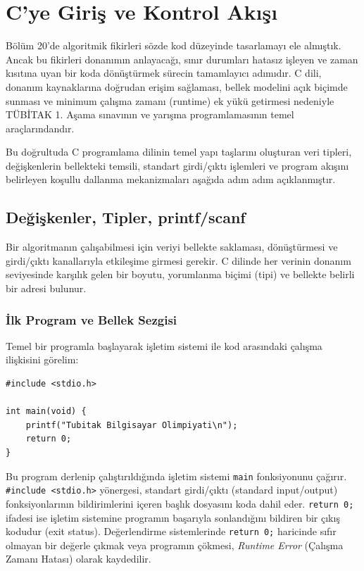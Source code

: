 \chapter[C'ye Giriş ve Kontrol Akışı · \textit{Temel}]{C'ye Giriş ve Kontrol Akışı}

Bölüm 20'de algoritmik fikirleri sözde kod düzeyinde tasarlamayı ele almıştık. Ancak bu fikirleri donanımın anlayacağı, sınır durumları hatasız işleyen ve zaman kısıtına uyan bir koda dönüştürmek sürecin tamamlayıcı adımıdır. C dili, donanım kaynaklarına doğrudan erişim sağlaması, bellek modelini açık biçimde sunması ve minimum çalışma zamanı (runtime) ek yükü getirmesi nedeniyle TÜBİTAK 1. Aşama sınavının ve yarışma programlamasının temel araçlarındandır.

Bu doğrultuda C programlama dilinin temel yapı taşlarını oluşturan veri tipleri, değişkenlerin bellekteki temsili, standart girdi/çıktı işlemleri ve program akışını belirleyen koşullu dallanma mekanizmaları aşağıda adım adım açıklanmıştır.

\section{Değişkenler, Tipler, printf/scanf}

Bir algoritmanın çalışabilmesi için veriyi bellekte saklaması, dönüştürmesi ve girdi/çıktı kanallarıyla etkileşime girmesi gerekir. C dilinde her verinin donanım seviyesinde karşılık gelen bir boyutu, yorumlanma biçimi (tipi) ve bellekte belirli bir adresi bulunur.

\subsection{İlk Program ve Bellek Sezgisi}

Temel bir programla başlayarak işletim sistemi ile kod arasındaki çalışma ilişkisini görelim:

\begin{lstlisting}[language=CTemel]
#include <stdio.h>

int main(void) {
    printf("Tubitak Bilgisayar Olimpiyati\n");
    return 0;
}
\end{lstlisting}

Bu program derlenip çalıştırıldığında işletim sistemi \texttt{main} fonksiyonunu çağırır. \texttt{\#include <stdio.h>} yönergesi, standart girdi/çıktı (standard input/output) fonksiyonlarının bildirimlerini içeren başlık dosyasını koda dahil eder. \texttt{return 0;} ifadesi ise işletim sistemine programın başarıyla sonlandığını bildiren bir çıkış kodudur (exit status). Değerlendirme sistemlerinde \texttt{return 0;} haricinde sıfır olmayan bir değerle çıkmak veya programın çökmesi, \textit{Runtime Error} (Çalışma Zamanı Hatası) olarak kaydedilir.


